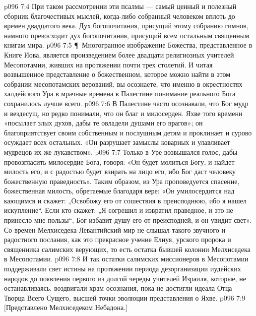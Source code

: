 \vs p096 7:4 При таком рассмотрении эти псалмы --- самый ценный и полезный сборник благочестивых мыслей, когда\hyp{}либо собранный человеком вплоть до времен двадцатого века. Дух богопочитания, присущий этому собранию гимнов, намного превосходит дух богопочитания, присущий всем остальным священным книгам мира.
\vs p096 7:5 \P\ Многогранное изображение Божества, представленное в Книге Иова, является произведением более двадцати религиозных учителей Месопотамии, живших на протяжении почти трех столетий. И читая возвышенное представление о божественном, которое можно найти в этом собрании месопотамских верований, вы осознаете, что именно в окрестностях халдейского Ура в мрачные времена в Палестине понимание реального Бога сохранилось лучше всего.
\vs p096 7:6 В Палестине часто осознавали, что Бог мудр и вездесущ, но редко понимали, что он благ и милосерден. Яхве того времени «посылает злых духов, дабы те овладели душами его врагов»; он благоприятствует своим собственным и послушным детям и проклинает и сурово осуждает всех остальных. «Он разрушает замыслы коварных и улавливает мудрецов их же лукавством».
\vs p096 7:7 Только в Уре возвышался голос, дабы провозгласить милосердие Бога, говоря: «Он будет молиться Богу, и найдет милость его, и с радостью будет взирать на лицо его, ибо Бог даст человеку божественную праведность». Таким образом, из Ура проповедуется спасение, божественная милость, обретаемые благодаря вере: «Он умилосердится над кающимся и скажет: „Освобожу его от сошествия в преисподнюю, ибо я нашел искупление“. Если кто скажет: „Я согрешил и извратил праведное, и это не принесло мне пользы“, Бог избавит душу его от преисподней, и он увидит свет». Со времен Мелхиседека Левантийский мир не слышал такого звучного и радостного послания, как это прекрасное учение Елиуя, урского пророка и священника салимских верующих, то есть остатка бывшей колонии Мелхиседека в Месопотамии.
\vs p096 7:8 И так остатки салимских миссионеров в Месопотамии поддерживали свет истины на протяжении периода дезорганизации иудейских народов до появления первого из долгой череды учителей Израиля, которые, не останавливаясь, воздвигали храм осознания, пока не достигли идеала Отца Творца Всего Сущего, высшей точки эволюции представления о Яхве.
\vs p096 7:9 [Представлено Мелхиседеком Небадона.]

